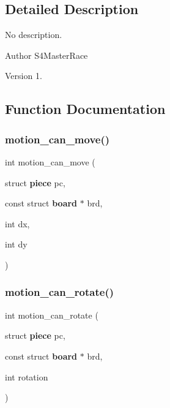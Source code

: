 \subsection{Detailed Description}
No description. 

\begin{DoxyAuthor}{Author}
S4\+Master\+Race 
\end{DoxyAuthor}
\begin{DoxyVersion}{Version}
1. 
\end{DoxyVersion}


\subsection{Function Documentation}
\mbox{\label{motion_8c_a44d62ec0304b3efce7d5d76f597fed22}} 
\subsubsection{motion\+\_\+can\+\_\+move()}
{\footnotesize\ttfamily int motion\+\_\+can\+\_\+move (\begin{DoxyParamCaption}\item[{struct \textbf{ piece}}]{pc,  }\item[{const struct \textbf{ board} $\ast$}]{brd,  }\item[{int}]{dx,  }\item[{int}]{dy }\end{DoxyParamCaption})}

\mbox{\label{motion_8c_afd171d9e0c9f0884598c492d7d3ed8e9}} 
\subsubsection{motion\+\_\+can\+\_\+rotate()}
{\footnotesize\ttfamily int motion\+\_\+can\+\_\+rotate (\begin{DoxyParamCaption}\item[{struct \textbf{ piece}}]{pc,  }\item[{const struct \textbf{ board} $\ast$}]{brd,  }\item[{int}]{rotation }\end{DoxyParamCaption})}

